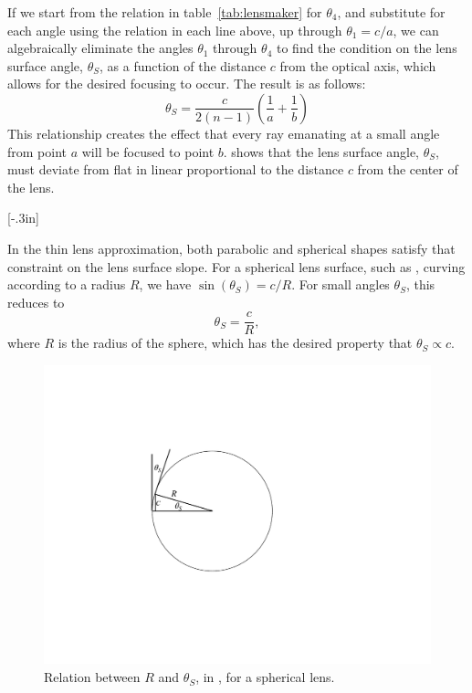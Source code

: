 If we start from the relation in table~\ref{tab:lensmaker} for $\theta_4$, and substitute for each angle using the relation in each line above, up through $\theta_1 = c/a$, we can algebraically eliminate the angles $\theta_1$ through $\theta_4$ to find the condition on the lens surface angle, $\theta_S$, as a function of the distance $c$ from the optical axis, which  allows for the desired focusing to occur.  The result is as follows: 
\begin{equation}
    \theta_S = \frac{c}{2(n-1)} \left( \frac{1}{a} + \frac{1}{b} \right)
\label{eq:ts1}
\end{equation}
This relationship creates the effect that every ray emanating at a small angle from point $a$ will be focused to point $b$.  \Eqn{\ref{eq:ts1}} shows that the lens surface angle, $\theta_S$, must deviate from flat in linear proportional to the distance $c$ from the center of the lens.

[-.3in]


In the thin lens approximation, both parabolic and spherical shapes satisfy that constraint on the lens surface slope.
For a spherical lens surface, such as \fig{\ref{fig:sphereLens}},  curving according to a radius $R$, we have $\sin(\theta_S) = c/R$.  For small angles $\theta_S$, this reduces to
\begin{equation}
    \theta_S = \frac{c}{R},
    \label{eq:ts2}
\end{equation}
where $R$ is the radius of the sphere, which has the desired property that $\theta_S \propto c$.  


\begin{figure}
\centerline{
\includegraphics[width=0.3\linewidth]{figures/imaging/sphereLens3.pdf}}
\caption{Relation between $R$ and $\theta_S$, in \eqn{\ref{eq:ts2}}, for a spherical lens.}
\label{fig:sphereLens}
\end{figure}

